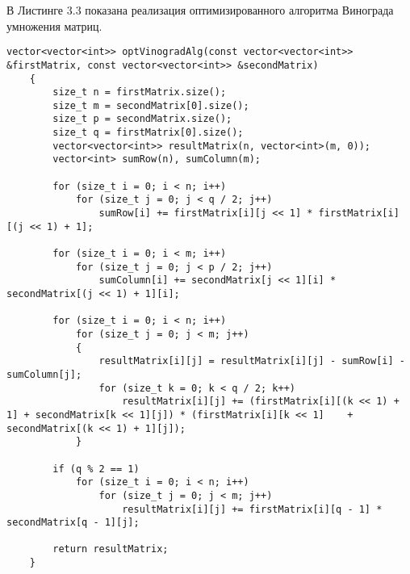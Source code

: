 В Листинге 3.3 показана реализация оптимизированного алгоритма Винограда умножения матриц.
\begin{lstlisting}[caption=Оптимизированный алгоритм Винограда умножения матриц]
	vector<vector<int>> optVinogradAlg(const vector<vector<int>> &firstMatrix, const vector<vector<int>> &secondMatrix)
	{
		size_t n = firstMatrix.size(); 
		size_t m = secondMatrix[0].size();
		size_t p = secondMatrix.size(); 
		size_t q = firstMatrix[0].size();
		vector<vector<int>> resultMatrix(n, vector<int>(m, 0)); 
		vector<int> sumRow(n), sumColumn(m); 
		
		for (size_t i = 0; i < n; i++)
			for (size_t j = 0; j < q / 2; j++)
				sumRow[i] += firstMatrix[i][j << 1] * firstMatrix[i][(j << 1) + 1]; 
			
		for (size_t i = 0; i < m; i++)
			for (size_t j = 0; j < p / 2; j++)
				sumColumn[i] += secondMatrix[j << 1][i] * secondMatrix[(j << 1) + 1][i];             
		
		for (size_t i = 0; i < n; i++)
			for (size_t j = 0; j < m; j++)
			{
				resultMatrix[i][j] = resultMatrix[i][j] - sumRow[i] - sumColumn[j];
				for (size_t k = 0; k < q / 2; k++)
					resultMatrix[i][j] += (firstMatrix[i][(k << 1) + 1] + secondMatrix[k << 1][j]) * (firstMatrix[i][k << 1] 	+ secondMatrix[(k << 1) + 1][j]);
			}
		
		if (q % 2 == 1)
			for (size_t i = 0; i < n; i++)
				for (size_t j = 0; j < m; j++)
					resultMatrix[i][j] += firstMatrix[i][q - 1] * secondMatrix[q - 1][j];
		
		return resultMatrix;
	}
\end{lstlisting}
\clearpage

